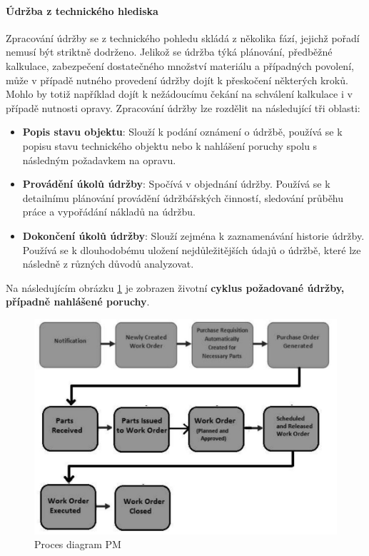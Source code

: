 \documentclass[thesis=M,czech]{FITthesis}[2012/06/26]
\begin{document}
\paragraph{Údržba z technického hlediska}
Zpracování údržby se z technického pohledu skládá z několika fází, jejichž pořadí nemusí být striktně dodrženo. Jelikož se údržba týká plánování, předběžné kalkulace, zabezpečení dostatečného množství materiálu a případných povolení, může v případě nutného provedení údržby dojít k přeskočení některých kroků. Mohlo by totiž například dojít k nežádoucímu čekání na schválení kalkulace i v případě nutnosti opravy. Zpracování údržby lze rozdělit na následující tři oblasti:
\begin{itemize}
	\item
	\textbf{Popis stavu objektu}: Slouží k podání oznámení o údržbě, používá se k popisu stavu technického objektu nebo k nahlášení poruchy spolu s následným požadavkem na opravu.
	\item
	\textbf{Provádění úkolů údržby}: Spočívá v objednání údržby. Používá se k detailnímu plánování provádění údržbářských činností, sledování průběhu práce a vypořádání nákladů na údržbu.
	\item
	\textbf{Dokončení úkolů údržby}: Slouží zejména k zaznamenávání historie údržby. Používá se k dlouhodobému uložení nejdůležitějších údajů o údržbě, které lze následně z různých důvodů analyzovat. 
\end{itemize} 
Na následujícím obrázku \ref{img:pm_process} je zobrazen životní \textbf{cyklus požadované údržby, případně nahlášené poruchy}.
\begin{figure}[H]
	\centering
	\includegraphics[width=1\textwidth]{images/pm_process.jpg}
	\caption{Proces diagram PM}
	\label{img:pm_process}
\end{figure}
\end{document}

